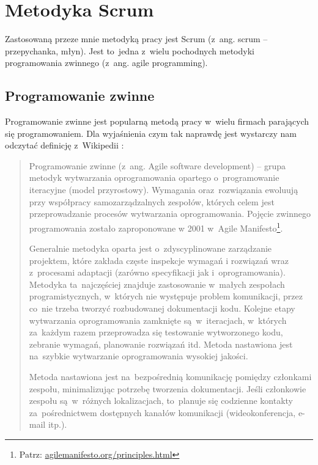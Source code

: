 \section{Metodyka Scrum} \label{scrum}

Zastosowaną przeze mnie metodyką pracy jest Scrum \cite{scrumalliance} (z~ang. scrum -- przepychanka, młyn). Jest to~jedna z~wielu pochodnych metodyki programowania zwinnego \cite{agile1} (z~ang. agile programming).

\subsection{Programowanie zwinne} \label{scrum.agile}

Programowanie zwinne jest popularną metodą pracy w~wielu firmach parających się programowaniem. Dla wyjaśnienia czym tak naprawdę jest wystarczy nam odczytać definicję z~Wikipedii \cite{agile2}:

\begin{quote}
Programowanie zwinne (z~ang. Agile software development) -- grupa metodyk wytwarzania oprogramowania opartego o~programowanie iteracyjne (model przyrostowy). Wymagania oraz~rozwiązania ewolu\-ują przy współpracy samozarządzalnych zespołów, których celem jest przeprowadzanie procesów wytwarzania oprogramowania. Pojęcie zwinnego programowania zostało zaproponowane w 2001 w~Agile Manifesto\footnote{Patrz: \url{agilemanifesto.org/principles.html}}.


Generalnie metodyka oparta jest o~zdyscyplinowane zarządzanie projektem, które zakłada częste inspekcje wymagań i rozwiązań wraz z~procesami adaptacji (zarówno specyfikacji jak i~oprogramowania). Metodyka ta~najczęściej znajduje zastosowanie w~małych zespołach programistycznych, w~których nie występuje problem komunikacji, przez co~nie trzeba tworzyć rozbudowanej dokumentacji kodu. Kolejne etapy wytwarzania oprogramowania zamknięte są~w~iteracjach, w~których za~każdym razem przeprowadza się testowanie wytworzonego kodu, zebranie wymagań, planowanie rozwiązań itd. Metoda nastawiona jest na~szybkie wytwarzanie oprogramowania wysokiej jakości.


Metoda nastawiona jest na~bezpośrednią komunikację pomiędzy członkami zespołu, minimalizując potrzebę tworzenia dokumentacji. Jeśli członkowie zespołu są~w~różnych lokalizacjach, to~planuje się codzienne kontakty za~pośrednictwem dostępnych kanałów komunikacji (wideokonferencja, e-mail itp.).
\end{quote}

